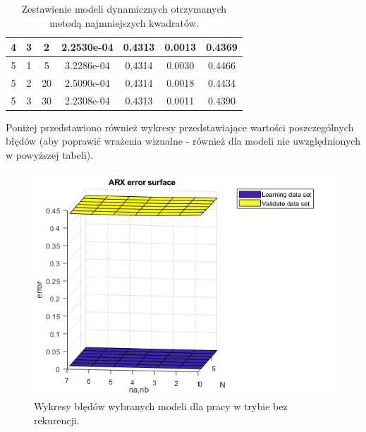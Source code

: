 \begin{table}[H]
\begin{tabular}{|c|c|c|c|c|c|c|}
4               & 3             &  2                  & 2.2530e-04              & 0.4313         & 0.0013              & 0.4369         \\ \hline
5               & 1             &  5                  & 3.2286e-04              & 0.4314         & 0.0030              & 0.4466        \\ \hline
5               & 2             &  20                & 2.5090e-04              & 0.4314         & 0.0018              & 0.4434         \\ \hline
5               & 3             &  30                 & 2.2308e-04              & 0.4313         & 0.0011              & 0.4390         \\ \hline
\end{tabular}
\caption{Zestawienie modeli dynamicznych otrzymanych metodą najmniejszych kwadratów.}
\end{table}
Poniżej przedstawiono również wykresy przedstawiające wartości poszczególnych błędów (aby poprawić wrażenia wizualne - również dla modeli nie uwzględnionych w powyższej tabeli).
\begin{figure}[H]
\centering
\includegraphics[width=15cm]{images/d_error_arx_ex.png}
\caption{Wykresy błędów wybranych modeli dla pracy w trybie bez rekurencji.}
\label{fig:d_error_arx_ex}
\end{figure}
